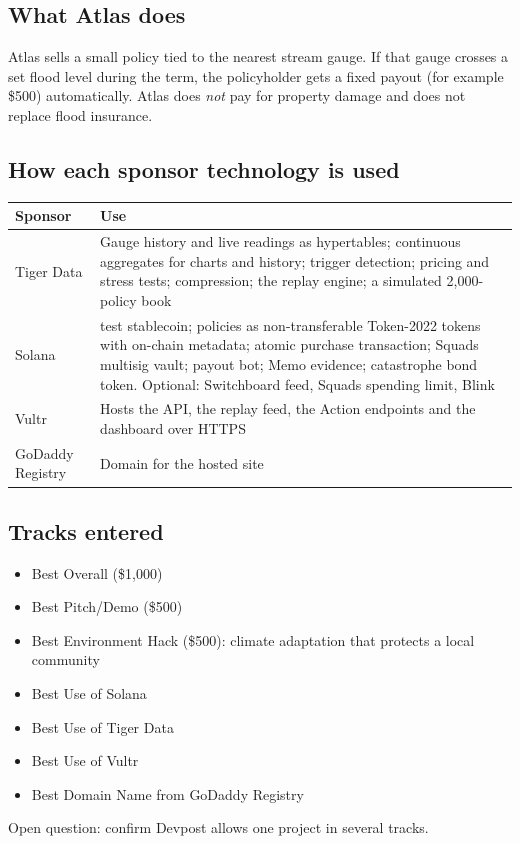 \documentclass[11pt]{article}
\newcommand{\code}[1]{\texttt{\detokenize{#1}}}
\begin{document}
\subsection{What Atlas does}
Atlas sells a small policy tied to the nearest stream gauge. If that gauge crosses a set flood level during the term, the policyholder gets a fixed payout (for example \$500) automatically. Atlas does \emph{not} pay for property damage and does not replace flood insurance.

\subsection{How each sponsor technology is used}
{\small
\begin{xltabular}{\linewidth}{@{}L{2.8cm} Y@{}}
\toprule
Sponsor & Use \\
\midrule
Tiger Data & Gauge history and live readings as hypertables; continuous aggregates for charts and history; trigger detection; pricing and stress tests; compression; the replay engine; a simulated 2,000-policy book \\
Solana & \code{aUSD} test stablecoin; policies as non-transferable Token-2022 tokens with on-chain metadata; atomic purchase transaction; Squads multisig vault; payout bot; Memo evidence; catastrophe bond token. Optional: Switchboard feed, Squads spending limit, Blink \\
Vultr & Hosts the API, the replay feed, the Action endpoints and the dashboard over HTTPS \\
GoDaddy Registry & Domain for the hosted site \\
\bottomrule
\end{xltabular}
}

\subsection{Tracks entered}
\begin{itemize}
\item Best Overall (\$1,000)
\item Best Pitch/Demo (\$500)
\item Best Environment Hack (\$500): climate adaptation that protects a local community
\item Best Use of Solana
\item Best Use of Tiger Data
\item Best Use of Vultr
\item Best Domain Name from GoDaddy Registry
\end{itemize}
Open question: confirm Devpost allows one project in several tracks.
\end{document}
